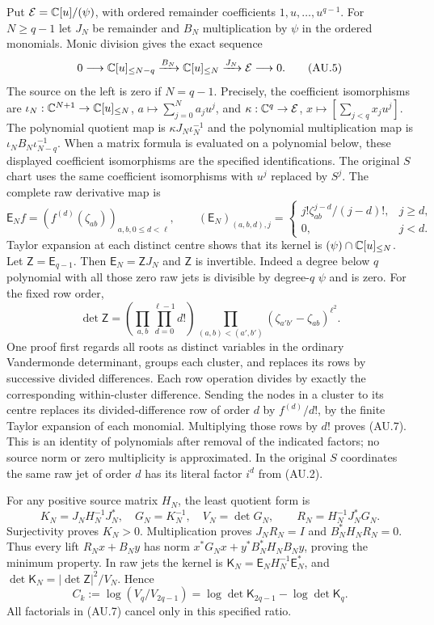 Put $\mathcal E=\mathbb{C}[u]/(\psi)$, with ordered remainder coefficients
$1,u,\ldots,u^{q-1}$. For $N\ge q-1$ let $J_N$ be remainder and
$B_N$ multiplication by $\psi$ in the ordered monomials. Monic division
gives the exact sequence
\[
 0\longrightarrow\mathbb{C}[u]_{\le N-q}
 \xrightarrow{B_N}\mathbb{C}[u]_{\le N}
 \xrightarrow{J_N}\mathcal E\longrightarrow0.              \tag{AU.5}
\]
The source on the left is zero if $N=q-1$.
Precisely, the coefficient isomorphisms are
$\iota_N:\mathbb{C}^{N+1}\to\mathbb{C}[u]_{\le N}$,
$a\mapsto\sum_{j=0}^Na_ju^j$, and
$\kappa:\mathbb{C}^q\to\mathcal E$, $x\mapsto[\sum_{j<q}x_ju^j]$.
The polynomial quotient map is $\kappa J_N\iota_N^{-1}$ and the
polynomial multiplication map is
$\iota_N B_N\iota_{N-q}^{-1}$. When a matrix formula is evaluated
on a polynomial below, these displayed coefficient isomorphisms are
the specified identifications. The original $S$ chart uses the same
coefficient isomorphisms with $u^j$ replaced by $S^j$.
The complete raw derivative map is
\[
 \mathsf E_N f=(f^{(d)}(\zeta_{ab}))_{a,b,0\le d<\ell},
 \qquad
 (\mathsf E_N)_{(a,b,d),j}=
 \begin{cases}j!\zeta_{ab}^{j-d}/(j-d)!,&j\ge d,\\0,&j<d.
 \end{cases}                                                \tag{AU.6}
\]
Taylor expansion at each distinct centre shows that its kernel is
$(\psi)\cap\mathbb{C}[u]_{\le N}$. Let $\mathsf Z=\mathsf E_{q-1}$.
Then $\mathsf E_N=\mathsf ZJ_N$ and $\mathsf Z$ is invertible.
Indeed a degree below $q$ polynomial with all those zero raw jets is
divisible by degree-$q$ $\psi$ and is zero. For the fixed row order,
\[
 \det\mathsf Z=
 \left(\prod_{a,b}\prod_{d=0}^{\ell-1}d!\right)
 \prod_{(a,b)<(a',b')}(\zeta_{a'b'}-\zeta_{ab})^{\ell^2}.
 \tag{AU.7}
\]
One proof first regards all roots as distinct variables in the ordinary
Vandermonde determinant, groups each cluster, and replaces its rows by
successive divided differences. Each row operation divides by exactly
the corresponding within-cluster difference. Sending the nodes in a
cluster to its centre replaces its divided-difference row of order $d$
by $f^{(d)}/d!$, by the finite Taylor expansion of each monomial.
Multiplying those rows by $d!$ proves (AU.7). This is an identity of
polynomials after removal of the indicated factors; no source norm or
zero multiplicity is approximated. In the original $S$ coordinates the
same raw jet of order $d$ has its literal factor $i^d$ from (AU.2).

For any positive source matrix $H_N$, the least quotient form is
\[
 K_N=J_NH_N^{-1}J_N^*,\quad G_N=K_N^{-1},\quad V_N=\det G_N,
 \qquad R_N=H_N^{-1}J_N^*G_N.                               \tag{AU.8}
\]
Surjectivity proves $K_N>0$. Multiplication proves $J_NR_N=I$ and
$B_N^*H_NR_N=0$. Thus every lift $R_Nx+B_Ny$ has norm
$x^*G_Nx+y^*B_N^*H_NB_Ny$, proving the minimum property.
In raw jets the kernel is $\mathsf K_N=\mathsf E_NH_N^{-1}\mathsf E_N^*$,
and $\det\mathsf K_N=|\det\mathsf Z|^2/V_N$. Hence
\[
 C_k:=\log(V_q/V_{2q-1})
      =\log\det\mathsf K_{2q-1}-\log\det\mathsf K_q.
 \tag{AU.9}
\]
All factorials in (AU.7) cancel only in this specified ratio.

